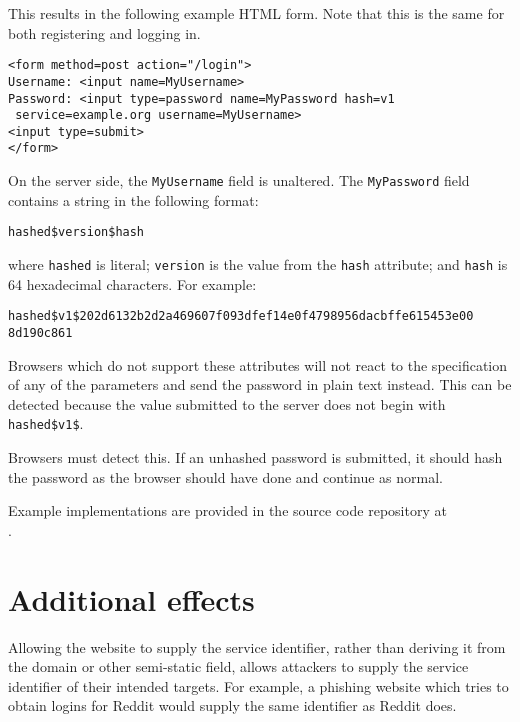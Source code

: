 \documentclass{paper}
\newcommand{\code}[1]{\texttt{\colorbox{gray!11}{#1}}}
\begin{document}
This results in the following example HTML form. Note that this is the same for both
registering and logging in.

\code{<form method=post action="/login">} \\
\code{Username: <input name=MyUsername>} \\
\code{Password: <input type=password name=MyPassword hash=v1} \\
\code{ service=example.org username=MyUsername>} \\
\code{<input type=submit>} \\
\code{</form>}

On the server side, the \code{MyUsername} field is unaltered. The \code{MyPassword} field
contains a string in the following format:

\code{hashed\$version\$hash}

where \code{hashed} is literal; \code{version} is the value from the \code{hash} attribute;
and \code{hash} is 64 hexadecimal characters. For example:

\code{hashed\$v1\$202d6132b2d2a469607f093dfef14e0f4798956dacbffe615453e00} \\
\code{8d190c861}

Browsers which do not support these attributes will not react to the specification of any of
the parameters and send the password in plain text instead. This can be detected because the
value submitted to the server does not begin with \code{hashed\$v1\$}.

Browsers must detect this. If an unhashed password is submitted, it should hash the password
as the browser should have done and continue as normal.

Example implementations are provided in the source code repository at \\
{\href{https://github.com/lgommans/browserhashing}{\underline{}}}.

\section{Additional effects}

Allowing the website to supply the service identifier, rather than deriving it from the
domain or other semi-static field, allows attackers to supply the service identifier of their
intended targets. For example, a phishing website which tries to obtain logins for Reddit
would supply the same identifier as Reddit does.
\end{document}
